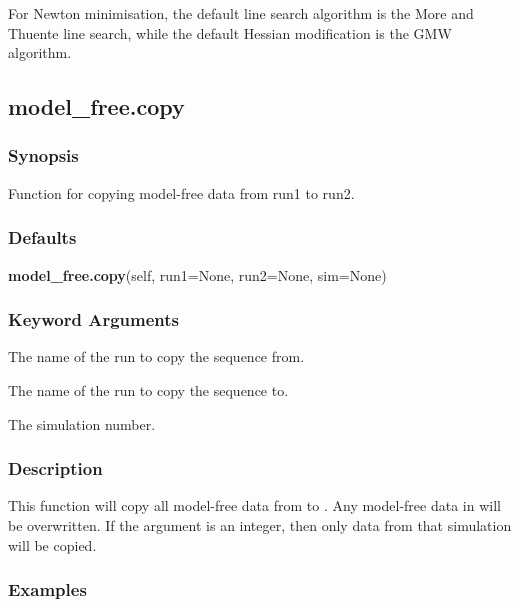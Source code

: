  For Newton minimisation, the default line search algorithm is the More and Thuente line search, while the default Hessian modification is the GMW algorithm. 
  

  

 \newpage 

 \subsection{model\_free.copy} 

  
 \subsubsection{Synopsis} 

 Function for copying model-free data from run1 to run2. 
  

  
 \subsubsection{Defaults} 

 \textsf{\textbf{model\_free.copy}(self, run1=None, run2=None, sim=None)} 

  
 \subsubsection{Keyword Arguments} 

   The name of the run to copy the sequence from.   

   The name of the run to copy the sequence to.   

   The simulation number.  

  

  
 \subsubsection{Description} 

 This function will copy all model-free data from  to .  Any model-free data in  will be overwritten.  If the argument  is an integer, then only data from that simulation will be copied. 
  

  
 \subsubsection{Examples} 

